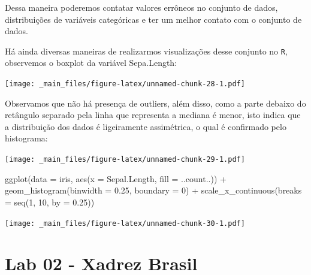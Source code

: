 \documentclass[
]{book}
\newenvironment{Shaded}{\begin{snugshade}}{\end{snugshade}}
\newcommand{\AttributeTok}[1]{\textcolor[rgb]{0.77,0.63,0.00}{#1}}
\newcommand{\DecValTok}[1]{\textcolor[rgb]{0.00,0.00,0.81}{#1}}
\newcommand{\FloatTok}[1]{\textcolor[rgb]{0.00,0.00,0.81}{#1}}
\newcommand{\FunctionTok}[1]{\textcolor[rgb]{0.00,0.00,0.00}{#1}}
\newcommand{\NormalTok}[1]{#1}
\newcommand{\SpecialCharTok}[1]{\textcolor[rgb]{0.00,0.00,0.00}{#1}}
\begin{document}
Dessa maneira poderemos contatar valores errôneos no conjunto de dados, distribuições de variáveis categóricas e ter um melhor contato com o conjunto de dados.

Há ainda diversas maneiras de realizarmos visualizações desse conjunto no \texttt{R}, observemos o boxplot da variável Sepa.Length:

\begin{Shaded}
\end{Shaded}

\texttt{[image: \_main\_files/figure-latex/unnamed-chunk-28-1.pdf]}

Observamos que não há presença de outliers, além disso, como a parte debaixo do retângulo separado pela linha que representa a mediana é menor, isto indica que a distribuição dos dados é ligeiramente assimétrica, o qual é confirmado pelo histograma:

\begin{Shaded}
\end{Shaded}

\texttt{[image: \_main\_files/figure-latex/unnamed-chunk-29-1.pdf]}

\begin{Shaded}
\begin{Highlighting}[]
\FunctionTok{ggplot}\NormalTok{(}\AttributeTok{data =}\NormalTok{ iris, }\FunctionTok{aes}\NormalTok{(}\AttributeTok{x =}\NormalTok{ Sepal.Length, }\AttributeTok{fill =}\NormalTok{ ..count..)) }\SpecialCharTok{+}
  \FunctionTok{geom\_histogram}\NormalTok{(}\AttributeTok{binwidth =} \FloatTok{0.25}\NormalTok{, }\AttributeTok{boundary =} \DecValTok{0}\NormalTok{) }\SpecialCharTok{+}
  \FunctionTok{scale\_x\_continuous}\NormalTok{(}\AttributeTok{breaks =} \FunctionTok{seq}\NormalTok{(}\DecValTok{1}\NormalTok{, }\DecValTok{10}\NormalTok{, }\AttributeTok{by =} \FloatTok{0.25}\NormalTok{)) }
\end{Highlighting}
\end{Shaded}

\texttt{[image: \_main\_files/figure-latex/unnamed-chunk-30-1.pdf]}

\hypertarget{lab-02---xadrez-brasil}{%
\section{Lab 02 - Xadrez Brasil}\label{lab-02---xadrez-brasil}}
\end{document}
